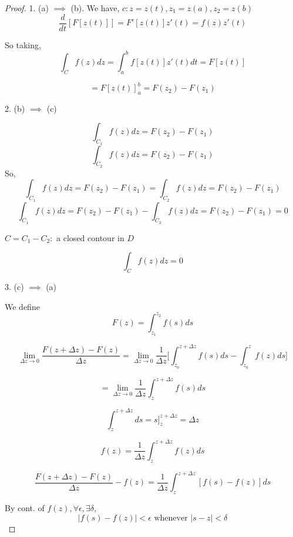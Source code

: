 \begin{proof}
   1. (a) $\implies$ (b). We have, $c: z= z(t), z_1 = z(a), z_2 = z(b)$
   $$\frac{d}{dt} [F[z(t)]] = F'[z(t)] z'(t) = f(z) z'(t)$$

   So taking, 
   $$ \int_C f(z) dz = \int_a^b f[z(t)]z'(t) dt = F[z(t)]$$ 
   
   $$ = F[z(t)]_a^{b} = F(z_2) - F(z_1)  $$ 

   2. (b) $\implies$ (c)

   $$\int_{C_1} f(z) dz = F(z_2) - F(z_1)$$
   $$\int_{C_2} f(z) dz = F(z_2) - F(z_1)$$
   So, 
   $$\int_{C_1} f(z) dz = F(z_2) - F(z_1) = \int_{C_2} f(z) dz = F(z_2) - F(z_1)$$
   $$\int_{C_1} f(z) dz = F(z_2) - F(z_1) - \int_{C_2} f(z) dz = F(z_2) - F(z_1) = 0$$

   $C = C_1 - C_2:$ a closed contour in $D$ 

   
   $$ \int_C f(z) dz = 0 $$ 


   3. (c) $\implies$ (a)

   We define  $$F(z) = \int_{z_1}^{z_2} f(s) ds$$

   
   $$ \lim_{\Delta z \to 0}  \frac{F(z + \Delta z) - F(z)}{\Delta z} = \lim_{\Delta z \to 0} \frac{1}{\Delta z}\bigg[ \int_{z_0}^{z + \Delta z} f(s) ds - \int_{z_0}^{z} f(z) ds \bigg ]$$ 
   
   $$ = \lim_{\Delta z \to 0} \frac{1}{\Delta z}\int_z^{z+\Delta z} f(s) ds $$ 

\begin{remark}
   $$\int_z^{z + \Delta z} ds = s]_z^{z + \Delta z} = \Delta z$$
\end{remark}
\begin{remark}
   $$ f(z) = \frac{1}{\Delta z} \int_z^{z + \Delta z} f(z) ds$$ 
\end{remark}



$$ \frac{F(z + \Delta z) - F(z)}{\Delta z} - f(z) = \frac{1}{\Delta z} \int_z^{z + \Delta z} [f(s) - f(z)] ds $$ 

By cont. of $f(z), \forall \epsilon, \exists \delta$,  
$$ |f(s) - f(z)| < \epsilon \text{ whenever } |s - z| < \delta $$


\end{proof}





